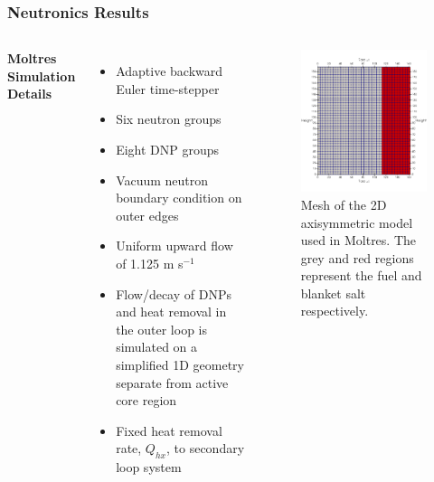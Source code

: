 \begin{frame}
	\frametitle{Neutronics Results}
	\begin{columns}
		\column{5.5cm}
		\textbf{Moltres Simulation Details}
		\begin{itemize}
			\small
			\item Adaptive backward Euler time-stepper
			\item Six neutron groups
			\item Eight \gls{DNP} groups
			\item Vacuum neutron boundary condition on outer edges
			\item Uniform upward flow of 1.125 m s$^{-1}$
			\item Flow/decay of \glspl{DNP} and heat removal in the outer loop
			is simulated on a simplified 1D geometry separate from active core
			region
			\item Fixed heat removal rate, $Q_{hx}$, to secondary loop system
		\end{itemize}
		\column{5cm}
		\begin{figure}
			\centering
			\includegraphics[width=\textwidth]{./images/mesh}
			\caption{\footnotesize Mesh of the 2D axisymmetric model used in
			Moltres. The
			grey and red regions represent the fuel and blanket salt
			respectively.}
			\label{fig:mesh}
		\end{figure}
	\end{columns}
\end{frame}

